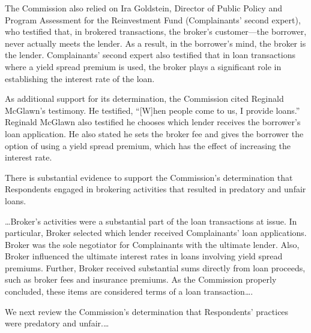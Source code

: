 The Commission also relied on Ira Goldstein, Director of Public Policy and
Program Assessment for the Reinvestment Fund (Complainants' second expert), who
testified that, in brokered transactions, the broker's customer---the
borrower, never actually meets the lender. As a result, in the borrower's mind,
the broker is the lender. Complainants' second expert also testified that in
loan transactions where a yield spread
premium is used, the broker plays a significant role in establishing
the interest rate of the loan. 

As additional support for its determination, the Commission cited Reginald
McGlawn's testimony. He testified, ``[W]hen people come to us, I provide
loans.'' Reginald McGlawn also testified he chooses which lender receives the
borrower's loan application. He also stated he sets the broker fee and gives
the borrower the option of using a yield spread premium, which has the effect
of increasing the interest rate. 


There is substantial evidence to support the Commission's determination that
Respondents engaged in brokering activities that resulted in predatory and
unfair loans.

\dots Broker's activities were a substantial part of the loan transactions at
issue. In particular, Broker selected which lender received Complainants' loan
applications. Broker was the sole negotiator for Complainants with the ultimate
lender. Also, Broker influenced the ultimate interest rates in loans involving
yield spread premiums. Further, Broker received substantial sums directly from
loan proceeds, such as broker fees and insurance premiums. As the Commission
properly concluded, these items are considered terms of a loan
transaction\dots.


We next review the Commission's determination that Respondents' practices were
predatory and unfair.\dots

